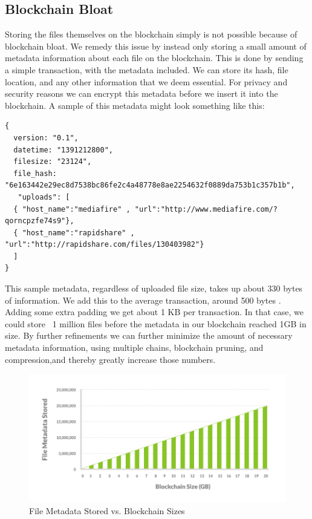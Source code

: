 \documentclass[a4paper,10pt]{article}
\begin{document}
\subsection{Blockchain Bloat}

Storing the files themselves on the blockchain simply is not possible because of blockchain bloat. We remedy this issue by instead only storing a small amount of metadata information about each file on the blockchain. This is done by sending a simple transaction, with the metadata included. We can store its hash, file location, and any other information that we deem essential. For privacy and security reasons we can encrypt this metadata before we insert it into the blockchain. A sample of this metadata might look something like this:\\

\begin{lstlisting}
{
  version: "0.1",
  datetime: "1391212800",
  filesize: "23124",
  file_hash: "6e163442e29ec8d7538bc86fe2c4a48778e8ae2254632f0889da753b1c357b1b",
   "uploads": [
  { "host_name":"mediafire" , "url":"http://www.mediafire.com/?qorncpzfe74s9"},
  { "host_name":"rapidshare" , "url":"http://rapidshare.com/files/130403982"}
  ]
}
\end{lstlisting}

This sample metadata, regardless of uploaded file size, takes up about 330 bytes of information. We add this to the average transaction, around 500 bytes \cite{13}. Adding some extra padding we get about 1 KB per transaction. In that case, we could store ~1 million files before the metadata in our blockchain reached 1GB in size. By further refinements we can further minimize the amount of necessary metadata information, using multiple chains, blockchain pruning, and compression,and thereby greatly increase those numbers.	

\begin{figure}[h!]
  \centering
      \includegraphics[width=\linewidth]{06}
  \caption{File Metadata Stored vs. Blockchain Sizes}
\end{figure}
\end{document}
